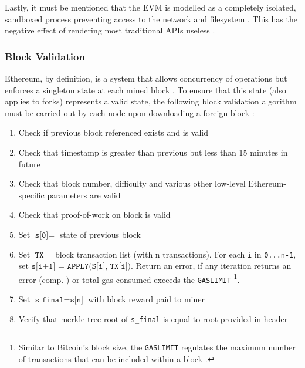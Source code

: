 Lastly, it must be mentioned that the \ac{EVM} is modelled as a completely isolated, sandboxed process preventing access to the network and filesystem \cite[p.~19]{solidityDocs}. This has the negative effect of rendering most traditional APIs useless \cite[p.~46]{Raval.2016}. 


%

\subsubsection{Block Validation}
Ethereum, by definition, is a system that allows concurrency of operations but enforces a singleton state at each mined block \cite[p.~151]{Antonopoulos.2018}. To ensure that this state (also applies to forks) represents a valid state, the following block validation algorithm must be carried out by each node upon downloading a foreign block \cite[p.~57]{Antonopoulos.2018} \cite[pp.~23]{ethereumWhitepaperGitHub}:

\begin{enumerate}
  \item Check if previous block referenced exists and is valid
  \item Check that timestamp is greater than previous but less than 15 minutes in future
  \item Check that block number, difficulty and various other low-level Ethereum-specific parameters are valid
  \item Check that proof-of-work on block is valid
  \item Set $\texttt{s[0]} =$ state of previous block
  \item Set $\texttt{TX} =$ block transaction list (with n transactions). For each \texttt{i} in \texttt{0...n-1}, set $\texttt{s[i+1] = APPLY(S[i], TX[i])}$. Return an error, if any iteration returns an error (comp. ) or total gas consumed exceeds the \texttt{GASLIMIT} \footnote{Similar to Bitcoin's block size, the \texttt{GASLIMIT} regulates the maximum number of transactions that can be included within a block \cite{blocksizeControversy} \cite[p.~8]{ethereumYellowPaper}.}.
  \item Set $\texttt{s\_final} = \texttt{s[n]}$ with block reward paid to miner
  \item Verify that merkle tree root of \texttt{s\_final} is equal to root provided in header
\end{enumerate}

